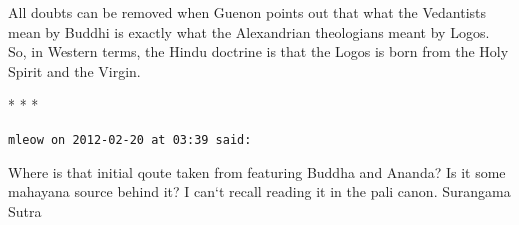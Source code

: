 All doubts can be removed when Guenon points out that what the Vedantists mean by Buddhi is exactly what the Alexandrian theologians meant by Logos. So, in Western terms, the Hindu doctrine is that the Logos is born from the Holy Spirit and the Virgin.



\begin{center}* * *\end{center}

\begin{footnotesize}
\begin{sffamily}
\texttt{mleow on 2012-02-20 at 03:39 said:}

Where is that initial qoute taken from featuring Buddha and Ananda? Is it some mahayana source behind it? I can`t recall reading it in the pali canon. Surangama Sutra 

\hfill

\end{sffamily}
\end{footnotesize}

